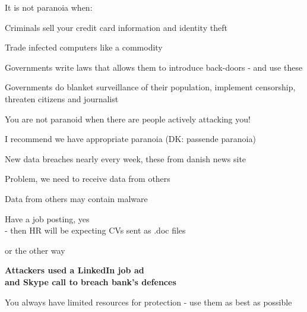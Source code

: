 \documentclass[Screen16to9,17pt]{foils}
\begin{document}
\begin{list1}
\item It is not paranoia when:
\begin{list2}
\item Criminals sell your credit card information and identity theft
\item Trade infected computers like a commodity
\item Governments write laws that allows them to introduce back-doors - and use these
\item Governments do blanket surveillance of their population, implement censorship, threaten citizens and journalist
\end{list2}
\end{list1}

\vskip 1cm
\centerline{You are not paranoid when there are people actively attacking you!}

I recommend we have appropriate paranoia (DK: passende paranoia)





New data breaches nearly every week, these from danish news site 

Problem, we need to receive data from others

Data from others may contain malware

Have a job posting, yes\\
- then HR will be expecting CVs sent as .doc files

\slide{}

or the other way

{\Large\bf Attackers used a LinkedIn job ad\\
and Skype call to breach bank’s defences}

{\footnotesize
{}}




\begin{list1}
\item You always have limited resources for protection - use them as best as possible
\end{list1}
\end{document}
